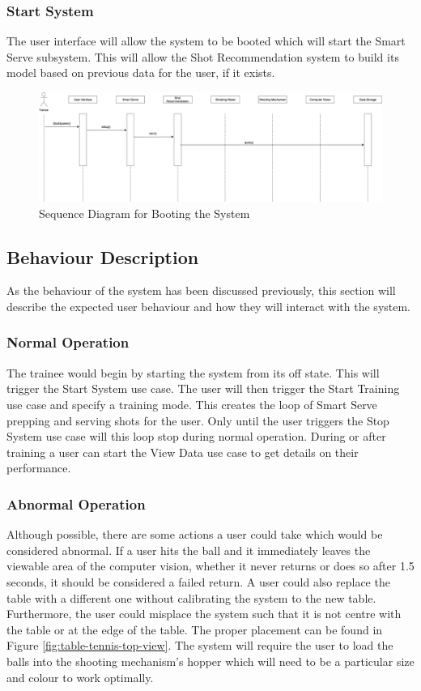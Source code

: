 \documentclass[11pt]{article}
\begin{document}
\subsubsection{Start System}
The user interface will allow the system to be booted which will start the Smart Serve subsystem. This will allow the Shot Recommendation system to build its model based on previous data for the user, if it exists.
\begin{figure}[H]
   \centering
   \includegraphics[width=\textwidth]{img/SequenceDiagram-Boot.png}
   \caption{Sequence Diagram for Booting the System}
   \label{fig:boot}
\end{figure}

\subsection{Behaviour Description}
As the behaviour of the system has been discussed previously, this section will describe the expected user behaviour and how they will interact with the system.
\subsubsection{Normal Operation}
The trainee would begin by starting the system from its off state. This will trigger the Start System use case. The user will then trigger the Start Training use case and specify a training mode. This creates the loop of Smart Serve prepping and serving shots for the user. Only until the user triggers the Stop System use case will this loop stop during normal operation. During or after training a user can start the View Data use case to get details on their performance.
\subsubsection{Abnormal Operation}
Although possible, there are some actions a user could take which would be considered abnormal. If a user hits the ball and it immediately leaves the viewable area of the computer vision, whether it never returns or does so after 1.5 seconds, it should be considered a failed return. A user could also replace the table with a different one without calibrating the system to the new table. Furthermore, the user could misplace the system such that it is not centre with the table or at the edge of the table. The proper placement can be found in Figure \ref{fig:table-tennis-top-view}. The system will require the user to load the balls into the shooting mechanism's hopper which will need to be a particular size and colour to work optimally.
\end{document}

